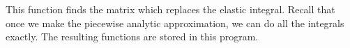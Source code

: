 This function finds the matrix which replaces the elastic integral.
Recall that once we make the piecewise analytic approximation, we can 
do all the integrals exactly. The resulting functions are stored in this 
program. 
